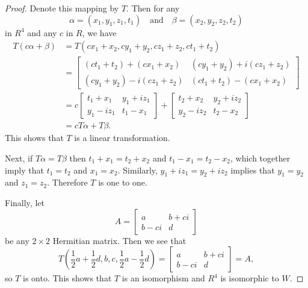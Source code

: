 \begin{proof}
  Denote this mapping by $T$. Then for any
  \begin{equation*}
    \alpha = (x_1,y_1,z_1,t_1) \quad\text{and}\quad
    \beta = (x_2,y_2,z_2,t_2)
  \end{equation*}
  in $R^4$ and any $c$ in $R$, we have
  \begin{align*}
    T(c\alpha + \beta)
    &= T(cx_1 + x_2, cy_1 + y_2, cz_1 + z_2, ct_1 + t_2) \\
    &=
    \begin{bmatrix}
      (ct_1 + t_2) + (cx_1 + x_2) & (cy_1 + y_2) + i(cz_1 + z_2) \\
      (cy_1 + y_2) - i(cz_1 + z_2) & (ct_1 + t_2) - (cx_1 + x_2)
    \end{bmatrix} \\
    &= c
    \begin{bmatrix}
      t_1 + x_1 & y_1 + iz_1 \\
      y_1 - iz_1 & t_1 - x_1
    \end{bmatrix}
    +
    \begin{bmatrix}
      t_2 + x_2 & y_2 + iz_2 \\
      y_2 - iz_2 & t_2 - x_2
    \end{bmatrix} \\
    &= cT\alpha + T\beta.
  \end{align*}
  This shows that $T$ is a linear transformation.

  Next, if $T\alpha = T\beta$ then $t_1 + x_1 = t_2 + x_2$ and
  $t_1 - x_1 = t_2 - x_2$, which together imply that $t_1 = t_2$ and
  $x_1 = x_2$. Similarly, $y_1 + iz_1 = y_2 + iz_2$ implies that
  $y_1 = y_2$ and $z_1 = z_2$. Therefore $T$ is one to one.

  Finally, let
  \begin{equation*}
    A =
    \begin{bmatrix}
      a & b + ci \\
      b - ci & d
    \end{bmatrix}
  \end{equation*}
  be any $2\times2$ Hermitian matrix. Then we see that
  \begin{equation*}
    T\left(\frac12a + \frac12d, b, c, \frac12a - \frac12d\right)
    =
    \begin{bmatrix}
      a & b + ci \\
      b - ci & d
    \end{bmatrix}
    = A,
  \end{equation*}
  so $T$ is onto. This shows that $T$ is an isomorphism and $R^4$ is
  isomorphic to $W$.
\end{proof}

